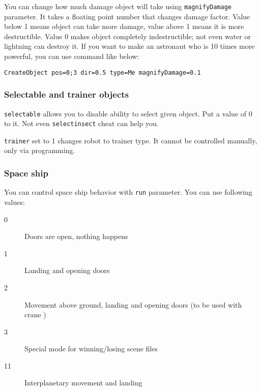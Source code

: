 You can change how much damage object will take using \texttt{magnifyDamage} parameter. It takes a floating point number that changes damage factor. Value below 1 means object can take more damage, value above 1 means it is more destructible. Value 0 makes object completely indestructible; not even water or lightning can destroy it. If you want to make an astronaut who is 10 times more powerful, you can use command like below:

\begin{lstlisting}[style=scene]
CreateObject pos=0;3 dir=0.5 type=Me magnifyDamage=0.1
\end{lstlisting}


\subsubsection{Selectable and trainer objects}

\texttt{selectable} allows you to disable ability to select given object. Put a value of 0 to it. Not even \texttt{selectinsect} cheat can help you.

\texttt{trainer} set to 1 changes robot to trainer type. It cannot be controlled manually, only via programming.



\subsubsection{Space ship}

You can control space ship behavior with \texttt{run} parameter. You can use following values:

\begin{description}
    \item[0] Doors are open, nothing happens
    \item[1] Landing and opening doors
    \item[2] Movement above ground, landing and opening doors (to be used with crane )
    \item[3] Special mode for winning/losing scene files
    \item[11] Interplanetary movement and landing 
\end{description}


